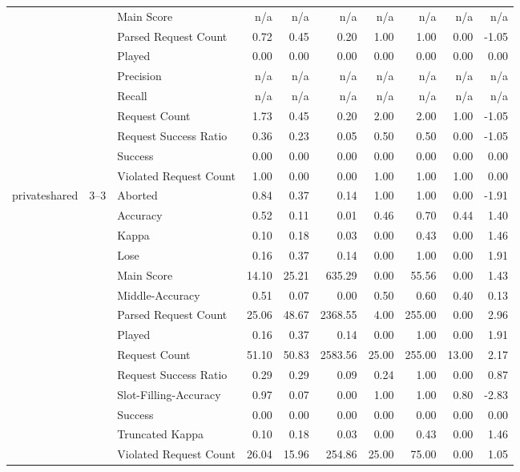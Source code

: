 \begin{tabular}{lllrrrrrrr}
 &  & Main Score & n/a & n/a & n/a & n/a & n/a & n/a & n/a \\
 &  & Parsed Request Count & 0.72 & 0.45 & 0.20 & 1.00 & 1.00 & 0.00 & -1.05 \\
 &  & Played & 0.00 & 0.00 & 0.00 & 0.00 & 0.00 & 0.00 & 0.00 \\
 &  & Precision & n/a & n/a & n/a & n/a & n/a & n/a & n/a \\
 &  & Recall & n/a & n/a & n/a & n/a & n/a & n/a & n/a \\
 &  & Request Count & 1.73 & 0.45 & 0.20 & 2.00 & 2.00 & 1.00 & -1.05 \\
 &  & Request Success Ratio & 0.36 & 0.23 & 0.05 & 0.50 & 0.50 & 0.00 & -1.05 \\
 &  & Success & 0.00 & 0.00 & 0.00 & 0.00 & 0.00 & 0.00 & 0.00 \\
 &  & Violated Request Count & 1.00 & 0.00 & 0.00 & 1.00 & 1.00 & 1.00 & 0.00 \\
\cline{1-10} \cline{2-10}
\multirow[t]{122}{*}{privateshared} & \multirow[t]{14}{*}{3--3} & Aborted & 0.84 & 0.37 & 0.14 & 1.00 & 1.00 & 0.00 & -1.91 \\
 &  & Accuracy & 0.52 & 0.11 & 0.01 & 0.46 & 0.70 & 0.44 & 1.40 \\
 &  & Kappa & 0.10 & 0.18 & 0.03 & 0.00 & 0.43 & 0.00 & 1.46 \\
 &  & Lose & 0.16 & 0.37 & 0.14 & 0.00 & 1.00 & 0.00 & 1.91 \\
 &  & Main Score & 14.10 & 25.21 & 635.29 & 0.00 & 55.56 & 0.00 & 1.43 \\
 &  & Middle-Accuracy & 0.51 & 0.07 & 0.00 & 0.50 & 0.60 & 0.40 & 0.13 \\
 &  & Parsed Request Count & 25.06 & 48.67 & 2368.55 & 4.00 & 255.00 & 0.00 & 2.96 \\
 &  & Played & 0.16 & 0.37 & 0.14 & 0.00 & 1.00 & 0.00 & 1.91 \\
 &  & Request Count & 51.10 & 50.83 & 2583.56 & 25.00 & 255.00 & 13.00 & 2.17 \\
 &  & Request Success Ratio & 0.29 & 0.29 & 0.09 & 0.24 & 1.00 & 0.00 & 0.87 \\
 &  & Slot-Filling-Accuracy & 0.97 & 0.07 & 0.00 & 1.00 & 1.00 & 0.80 & -2.83 \\
 &  & Success & 0.00 & 0.00 & 0.00 & 0.00 & 0.00 & 0.00 & 0.00 \\
 &  & Truncated Kappa & 0.10 & 0.18 & 0.03 & 0.00 & 0.43 & 0.00 & 1.46 \\
 &  & Violated Request Count & 26.04 & 15.96 & 254.86 & 25.00 & 75.00 & 0.00 & 1.05 \\

\end{tabular}
